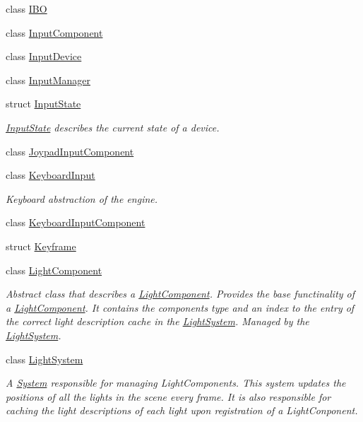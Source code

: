 \begin{DoxyCompactItemize}
\item 
class \hyperlink{class_blade_1_1_i_b_o}{I\+BO}
\item 
class \hyperlink{class_blade_1_1_input_component}{Input\+Component}
\item 
class \hyperlink{class_blade_1_1_input_device}{Input\+Device}
\item 
class \hyperlink{class_blade_1_1_input_manager}{Input\+Manager}
\item 
struct \hyperlink{struct_blade_1_1_input_state}{Input\+State}
\begin{DoxyCompactList}\small\item\em \hyperlink{struct_blade_1_1_input_state}{Input\+State} describes the current state of a device. \end{DoxyCompactList}\item 
class \hyperlink{class_blade_1_1_joypad_input_component}{Joypad\+Input\+Component}
\item 
class \hyperlink{class_blade_1_1_keyboard_input}{Keyboard\+Input}
\begin{DoxyCompactList}\small\item\em Keyboard abstraction of the engine. \end{DoxyCompactList}\item 
class \hyperlink{class_blade_1_1_keyboard_input_component}{Keyboard\+Input\+Component}
\item 
struct \hyperlink{struct_blade_1_1_keyframe}{Keyframe}
\item 
class \hyperlink{class_blade_1_1_light_component}{Light\+Component}
\begin{DoxyCompactList}\small\item\em Abstract class that describes a \hyperlink{class_blade_1_1_light_component}{Light\+Component}. Provides the base functinality of a \hyperlink{class_blade_1_1_light_component}{Light\+Component}. It contains the component\textquotesingle{}s type and an index to the entry of the correct light description cache in the \hyperlink{class_blade_1_1_light_system}{Light\+System}. Managed by the \hyperlink{class_blade_1_1_light_system}{Light\+System}. \end{DoxyCompactList}\item 
class \hyperlink{class_blade_1_1_light_system}{Light\+System}
\begin{DoxyCompactList}\small\item\em A \hyperlink{class_blade_1_1_system}{System} responsible for managing Light\+Components. This system updates the positions of all the lights in the scene every frame. It is also responsible for caching the light descriptions of each light upon registration of a Light\+Conponent. \end{DoxyCompactList}\item 

\end{DoxyCompactItemize}
